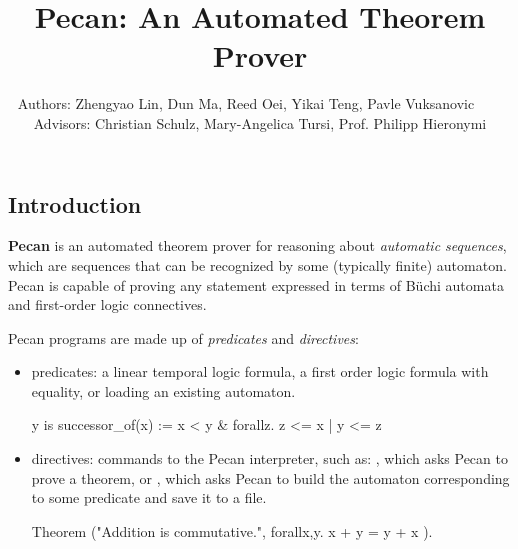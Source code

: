 \documentclass[landscape,usenames,dvipsnames, 25pt]{sciposter}
\title{\Huge Pecan: An Automated Theorem Prover}
\author{
Authors: Zhengyao Lin, Dun Ma, Reed Oei, Yikai Teng, Pavle Vuksanovic~~~~
Advisors: Christian Schulz, Mary-Angelica Tursi, Prof. Philipp Hieronymi}
\begin{document}

\maketitle
\vspace{-5ex}
\begin{multicols}{3}  %



\section*{Introduction}

\textbf{Pecan} is an automated theorem prover for reasoning about \emph{automatic sequences}, which are sequences that can be recognized by some (typically finite) automaton. Pecan is capable of proving any statement expressed in terms of B\"uchi automata and first-order logic connectives.

Pecan programs are made up of \emph{predicates} and \emph{directives}:

\begin{itemize}
    \item predicates: a linear temporal logic formula, a first order logic formula with equality, or loading an existing automaton.
\begin{pecan}
y is successor_of(x) := x < y & forallz. z <= x | y <= z
\end{pecan}

    \item directives: commands to the Pecan interpreter, such as: , which asks Pecan to prove a theorem, or , which asks Pecan to build the automaton corresponding to some predicate and save it to a file.
\begin{pecan}
Theorem ("Addition is commutative.", { forallx,y. x + y = y + x }).
\end{pecan}



\end{itemize}
\end{multicols}
\end{document}

